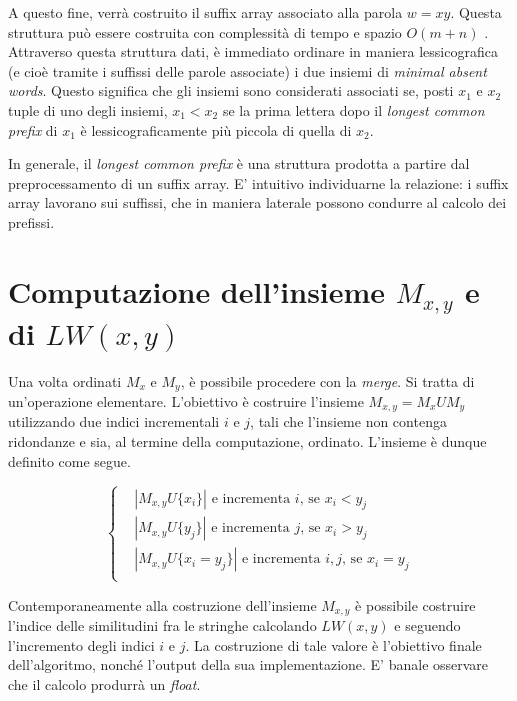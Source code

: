 A questo fine, verrà costruito il suffix array associato alla parola $w=xy$. Questa struttura può essere costruita con complessità di tempo e spazio $O(m+n)$ \cite{suffixArray}. Attraverso questa struttura dati, è immediato ordinare in maniera lessicografica (e cioè tramite i suffissi delle parole associate) i due insiemi di \textit{minimal absent words}. 
Questo significa che gli insiemi sono considerati associati se, posti $x_1$ e $x_2$ tuple di uno degli insiemi, $x_1 < x_2$ se la prima lettera dopo il \textit{longest common prefix} di $x_1$ è lessicograficamente più piccola di quella di $x_2$. 

In generale, il \textit{longest common prefix} è una struttura prodotta a partire dal preprocessamento di un suffix array. E' intuitivo individuarne la relazione: i suffix array lavorano sui suffissi, che in maniera laterale possono condurre al calcolo dei prefissi.

\section{Computazione dell'insieme \(M_{x,y}\) e di \(LW(x,y)\)}

Una volta ordinati $M_x$ e $M_y$, è possibile procedere con la \textit{merge}. Si tratta di un'operazione elementare. L'obiettivo è costruire l'insieme $M_{x,y} = M_x U M_y$ utilizzando due indici incrementali $i$ e $j$, tali che l'insieme non contenga ridondanze e sia, al termine della computazione, ordinato. L'insieme è dunque definito come segue.

\begin{equation*}
  \left\{
    \begin{aligned}
      & {\left|
        M_{x,y} U \{x_i \}
      \right|} \text{ e incrementa } i\text{, se } x_i < y_j \\
      & {\left|
        M_{x,y} U \{y_j \}
      \right|} \text{ e incrementa } j\text{, se } x_i > y_j \\
      & {\left|
        M_{x,y} U \{x_i = y_j \}
      \right|} \text{ e incrementa } i,j\text{, se } x_i = y_j \\
    \end{aligned}
  \right.
\end{equation*}

Contemporaneamente alla costruzione dell'insieme $M_{x,y}$ è possibile costruire l'indice delle similitudini fra le stringhe calcolando $LW(x,y)$ e seguendo l'incremento degli indici $i$ e $j$. La costruzione di tale valore è l'obiettivo finale dell'algoritmo, nonché l'output della sua implementazione. E' banale osservare che il calcolo produrrà un \textit{float}.

